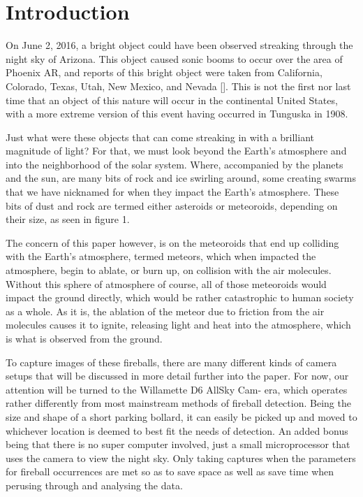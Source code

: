 \chapter{Introduction}

On June 2, 2016, a bright object could have been observed streaking through the night sky of Arizona. 
This object caused sonic booms to occur over the area of Phoenix AR, and reports of this bright object were taken from California, Colorado, Texas, Utah, New Mexico, and Nevada [\cite{palotai2018analysis}]. 
This is not the first nor last time that an object of this nature will occur in the continental United States, with a more extreme version of this event having occurred in Tunguska in 1908\cite{PBrown2002}.

Just what were these objects that can come streaking in with a brilliant magnitude of light? 
For that, we must look beyond the Earth's atmosphere and into the neighborhood of the solar system. 
Where, accompanied by the planets and the sun, are many bits of rock and ice swirling around, some creating swarms that we have nicknamed for when they impact the Earth's atmosphere. 
These bits of dust and rock are termed either asteroids or meteoroids, depending on their size, as seen in figure 1. 

The concern of this paper however, is on the meteoroids that end up colliding with the Earth's atmosphere, termed meteors, which when impacted the atmosphere, begin to ablate, or burn up, on collision with the air molecules. 
Without this sphere of atmosphere of course, all of those meteoroids would impact the ground directly, which would be rather catastrophic to human society as a whole. 
As it is, the ablation of the meteor due to friction from the air molecules causes it to ignite, releasing light and heat into the atmosphere, which is what is observed from the ground.

To capture images of these fireballs, there are many different kinds of camera setups that will be discussed in more detail further into the paper. For now, our attention will be turned to the Willamette D6 AllSky Cam-
era, which operates rather differently from most mainstream methods of fireball detection. 
Being the size and shape of a short parking bollard, it can easily be picked up and moved to whichever location is deemed to best fit the needs of detection. 
An added bonus being that there is no super computer involved, just a small microprocessor that uses the camera to view the night sky. 
Only taking captures when the parameters for fireball occurrences are met so as to save space as well as save time when perusing through and analysing the data.

